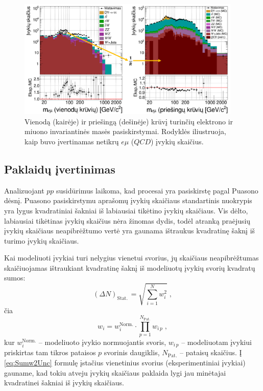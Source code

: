 \documentclass[a4paper, 12pt, twoside]{article}
\newcommand{\emu}{e\mu}
\newlength\q
\begin{document}
\begin{figure}[H]
	\includegraphics[width=0.95\textwidth]{emuQCDest.png}
	\vspace{-0.2cm}
	\caption{\label{fig:emuQCD} Vienodą (kairėje) ir priešingą (dešinėje) krūvį turinčių elektrono ir
	miuono invariantinės masės pasiskirstymai.
	Rodyklės iliustruoja, kaip buvo įvertinamas netikrų $\emu$ ($QCD$) įvykių skaičius.
	}
\end{figure}

\vspace{-1cm}
\subsection{Paklaidų įvertinimas}\label{sec:uncertainties}
\vspace{-0.2cm}

Analizuojant $pp$ susidūrimus laikoma, kad procesai yra pasiskirstę pagal Puasono dėsnį.
Puasono pasiskirstymu aprašomų įvykių skaičiaus standartinis nuokrypis yra lygus kvadratiniai šakniai iš labiausiai
tikėtino įvykių skaičiaus.
Vis dėlto, labiausiai tikėtinas įvykių skaičius nėra žinomas dydis, todėl atranką praėjusių įvykių skaičiaus neapibrėžtumo
vertė yra gaunama ištraukus kvadratinę šaknį iš turimo įvykių skaičiaus.

Kai modeliuoti įvykiai turi nelygius vienetui svorius, jų skaičiaus neapibrėžtumas skaičiuojamas ištraukiant
kvadratinę šaknį iš modeliuotų įvykių svorių kvadratų sumos:
\begin{equation}
	(\Delta N)_{\mathrm{Stat.\,}} = \sqrt{\sum_{i=1}^{N}w_{i}^{2}} \; ,
	\label{eq:Sumw2Unc}
\end{equation}
čia $$w_{i}=w_{i}^{\mathrm{Norm.}} \cdot \prod_{p=1}^{N_{\mathrm{Pat.}}}w_{i \, p} \; ,$$
kur $w_{i}^{\mathrm{Norm.}}$ -- modeliuoto įvykio normuojantis svoris, $w_{i \, p}$ -- modeliuotam įvykiui priskirtas
tam tikros pataisos $p$ svorinis daugiklis, $N_{\mathrm{Pat.}}$ -- pataisų skaičius.
Į \eqref{eq:Sumw2Unc} formulę įstačius vienetinius svorius (eksperimentiniai įvykiai) gauname, kad tokiu atveju įvykių
skaičiaus paklaida lygi jau minėtajai kvadratinei šakniai iš įvykių skaičiaus.
\end{document}
